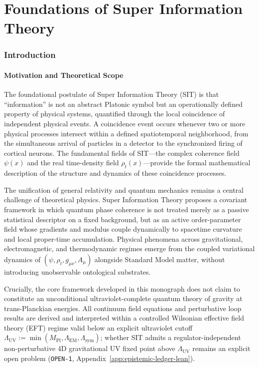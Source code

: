 \part{Foundations of Super Information Theory}

\section{Introduction}
\label{sec:introduction}

\subsection{Motivation and Theoretical Scope}

The foundational postulate of Super Information Theory (SIT) is that ``information'' is not an abstract Platonic symbol but an operationally defined property of physical systems, quantified through the local coincidence of independent physical events. A coincidence event occurs whenever two or more physical processes intersect within a defined spatiotemporal neighborhood, from the simultaneous arrival of particles in a detector to the synchronized firing of cortical neurons. The fundamental fields of SIT---the complex coherence field $\psi(x)$ and the real time-density field $\rho_t(x)$---provide the formal mathematical description of the structure and dynamics of these coincidence processes.

The unification of general relativity and quantum mechanics remains a central challenge of theoretical physics. Super Information Theory proposes a covariant framework in which quantum phase coherence is not treated merely as a passive statistical descriptor on a fixed background, but as an active order-parameter field whose gradients and modulus couple dynamically to spacetime curvature and local proper-time accumulation. Physical phenomena across gravitational, electromagnetic, and thermodynamic regimes emerge from the coupled variational dynamics of $(\psi, \rho_t, g_{\mu\nu}, A_\mu)$ alongside Standard Model matter, without introducing unobservable ontological substrates.

Crucially, the core framework developed in this monograph does not claim to constitute an unconditional ultraviolet-complete quantum theory of gravity at trans-Planckian energies. All continuum field equations and perturbative loop results are derived and interpreted within a controlled Wilsonian effective field theory (EFT) regime valid below an explicit ultraviolet cutoff $\Lambda_{\mathrm{UV}} := \min(M_{\mathrm{Pl}}, \Lambda_{\mathrm{EM}}, \Lambda_{\mathrm{sym}})$; whether SIT admits a regulator-independent non-perturbative 4D gravitational UV fixed point above $\Lambda_{\mathrm{UV}}$ remains an explicit open problem (\texttt{OPEN-1}, Appendix~\ref{app:epistemic-ledger-lean}).

